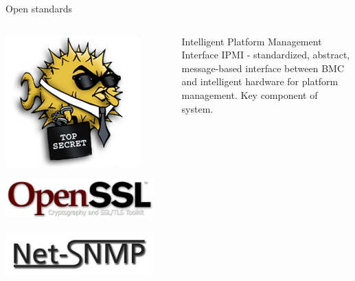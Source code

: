 \documentclass{beamer}
\begin{document}
\begin{frame}{Open standards}
\begin{columns}[onlytextwidth]
\begin{column}{0.2\textwidth}
				\includegraphics[width=\textwidth]{logo/openssh.png}

				\includegraphics[width=\textwidth]{logo/openssl.png}

				\includegraphics[width=\textwidth]{logo/netsnmp.jpg}
			\end{column}

			\begin{column}{0.1\textwidth}
			\end{column}

			\begin{column}{0.7\textwidth}
			\begin{block}{Intelligent Platform Management Interface}
				IPMI - standardized, abstract, message-based interface between BMC and intelligent hardware for platform management.
				Key component of system.
			\end{block}
			\pause


\end{column}
\end{columns}
\end{frame}
\end{document}
